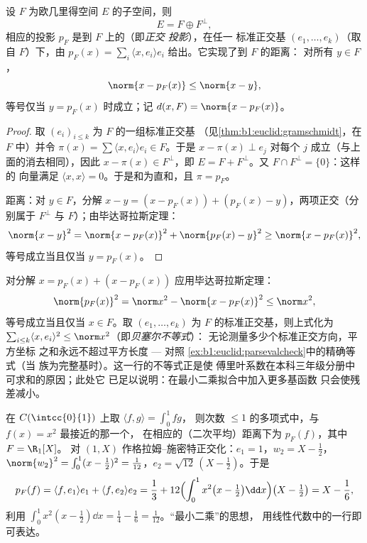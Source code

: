 \begin{theorem}[正交投影]\label{thm:b1:euclid:projection}
设 $F$ 为欧几里得空间 $E$ 的子空间，则
\[
E = F \oplus F^{\perp},
\]
相应的投影 $p_F$ 是到 $F$ 上的（即\emph{正交
投影}），在任一
标准正交基 $(e_1, \dots, e_k)$（取自 $F$）下，由 $p_F(x) = \sum_i
\langle x, e_i\rangle e_i$ 给出。它实现了到 $F$ 的距离：
对所有 $y \in F$，
\[
\norm{x - p_F(x)} \leq \norm{x - y},
\]
等号仅当 $y = p_F(x)$ 时成立；记 $d(x, F) = \norm{x -
p_F(x)}$。
\end{theorem}

\begin{proof}
取 $(e_i)_{i \leq k}$ 为 $F$ 的一组标准正交基
（见\cref{thm:b1:euclid:gramschmidt}，在 $F$ 中）并令 $\pi(x) =
\sum \langle x, e_i\rangle e_i \in F$。于是 $x - \pi(x) \perp e_j$
对每个 $j$ 成立（与上面的消去相同），因此 $x - \pi(x) \in
F^\perp$，即 $E = F + F^\perp$。又 $F \cap F^\perp = \{0\}$：这样的
向量满足 $\langle x, x\rangle = 0$。于是和为直和，且
$\pi = p_F$。

距离：对 $y \in F$，分解 $x - y = (x - p_F(x)) + (p_F(x) -
y)$，两项正交（分别属于 $F^\perp$ 与 $F$）；由毕达哥拉斯定理：
\[
\norm{x - y}^2 = \norm{x - p_F(x)}^2 + \norm{p_F(x) - y}^2
\geq \norm{x - p_F(x)}^2,
\]
等号成立当且仅当 $y = p_F(x)$。
\end{proof}

\begin{example}[投影不会使长度变长]
\label{ex:b1:euclid:bessel}
对分解 $x = p_F(x) + (x - p_F(x))$ 应用毕达哥拉斯定理：
\[
\norm{p_F(x)}^2 = \norm x^2 - \norm{x - p_F(x)}^2 \leq
\norm x^2 ,
\]
等号成立当且仅当 $x \in F$。取 $(e_1,
\dots, e_k)$ 为 $F$ 的标准正交基，则上式化为 $\sum_{i \leq k}\langle x,
e_i\rangle^2 \leq \norm x^2$（即\emph{贝塞尔不等式}）：
无论测量多少个标准正交方向，平方坐标
之和永远不超过平方长度 --- 对照
\cref{ex:b1:euclid:parsevalcheck}中的精确等式（当
族为完整基时）。这一行的不等式正是使
傅里叶系数在本科三年级分册中可求和的原因；此处它
已足以说明：在最小二乘拟合中加入更多基函数
只会使残差减小。
\end{example}

\begin{example}[最佳二次逼近]\label{ex:b1:euclid:bestapprox}
在 $C(\intcc{0}{1})$ 上取 $\langle f, g\rangle = \int_0^1 fg$，
则次数 $\leq 1$ 的多项式中，与 $f(x) = x^2$ 最接近的那一个，
在相应的（二次平均）距离下为 $p_F(f)$，其中 $F = \R_1[X]$。
对 $(1, X)$ 作格拉姆–施密特正交化：$e_1 = 1$，$w_2 = X - \frac12$，
$\norm{w_2}^2 = \int_0^1 (x - \frac12)^2 = \frac{1}{12}$，$e_2 =
\sqrt{12}\,(X - \tfrac12)$。于是
\[
p_F(f) = \langle f, e_1\rangle e_1 + \langle f, e_2\rangle e_2
= \frac13 + 12\Bigl(\int_0^1 x^2\bigl(x - \tfrac12\bigr)\dd
x\Bigr)\bigl(X - \tfrac12\bigr)
= X - \frac{1}{6},
\]
利用 $\int_0^1 x^2(x - \frac12)\dd x = \frac14 - \frac16 =
\frac{1}{12}$。“最小二乘”的思想，
用线性代数中的一行即可表达。
\end{example}

